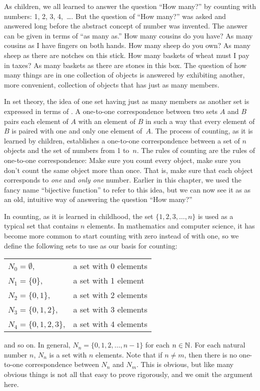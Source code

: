 As children, we all learned to answer the question ``How many?''
by counting with numbers: 1, 2, 3, 4,~\dots.  But the question of
``How many?'' was asked and answered long before the abstract concept of
number was invented.  The answer can be given in terms of ``as many as.''
How many cousins do you have?  As many cousins as I have fingers on both
hands.  How many sheep do you own?  As many sheep as there are notches
on this stick.  How many baskets of wheat must I pay in taxes?
As many baskets as there are stones in this box.  The question
of how many things are in one collection of objects is answered
by exhibiting another, more convenient, collection of objects
that has just as many members.  

In set theory, the idea of one set having just as many members
as another set is expressed in terms of .  A one-to-one correspondence between two sets
$A$ and $B$ pairs each element of $A$ with an element of $B$
in such a way that every element of $B$ is paired with one and
only one element of~$A$.  The process of counting, as it is learned
by children, establishes a one-to-one correspondence between a set of 
$n$ objects and the set of numbers from 1 to~$n$.  The rules
of counting are the rules of one-to-one correspondence:
Make sure you count every object, make sure you don't count
the same object more than once.  That is, make sure that
each object corresponds to \emph{one} and \emph{only one} number.
Earlier in this chapter,
we used the fancy name ``bijective function''
to refer to this idea, but we can now see it as
as an old, intuitive way of answering the question ``How many?''

\medbreak

In counting, as it is learned in childhood, the set $\{1,2,3,\dots,n\}$
is used as a typical set that contains $n$ elements.  In mathematics
and computer science, it has become more common to start counting with
zero instead of with one, so we define the following sets to use
as our basis for counting:
\begin{center}
\begin{tabular}{@{\qquad\qquad}ll}
   $N_0=\emptyset$,& a set with 0 elements\\
   $N_1=\{0\}$,& a set with 1 element\\
   $N_2=\{0,1\}$,& a set with 2 elements\\
   $N_3=\{0,1,2\}$,& a set with 3 elements\\
   $N_4=\{0,1,2,3\}$,& a set with 4 elements\\
\end{tabular}
\end{center}
\noindent and so on.  In general, $N_n=\{0,1,2,\dots,n-1\}$ for each $n\in{\mathbb N}$.
For each natural number $n$, $N_n$ is a set with $n$ elements.
Note that if $n\not= m$, then there is no one-to-one correspondence
between $N_n$ and $N_m$.  This is obvious, but like many obvious things
is not all that easy to prove rigorously, and we omit the argument here. 

